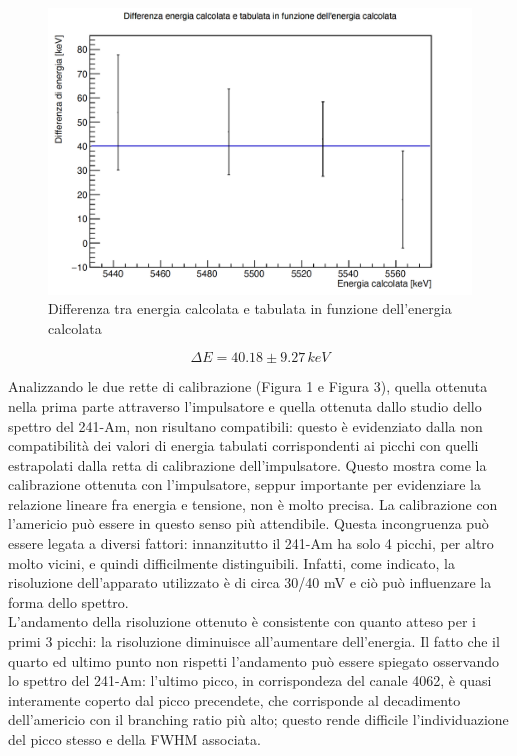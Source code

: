 \documentclass[a4paper,10pt]{article}
\begin{document}
\begin{figure}[H]
    \centering
    \includegraphics[scale=0.4]{discrepanza.png}
    \caption{Differenza tra energia calcolata e tabulata in funzione dell'energia calcolata}
\end{figure}

$$
    \Delta E = 40.18 \pm 9.27\, keV
$$

\noindent Analizzando le due rette di calibrazione (Figura 1 e Figura 3), quella ottenuta nella prima parte attraverso l'impulsatore e quella ottenuta dallo studio dello spettro del 241-Am, non risultano compatibili: questo \`e evidenziato dalla non compatibilit\`a dei valori di energia tabulati corrispondenti ai picchi con quelli estrapolati dalla retta di calibrazione dell'impulsatore. Questo mostra come la calibrazione ottenuta con l'impulsatore, seppur importante per evidenziare la relazione lineare fra energia e tensione, non \`e molto precisa. La calibrazione con l'americio pu\`o essere in questo senso pi\`u attendibile. Questa incongruenza pu\`o essere legata a diversi fattori: innanzitutto il 241-Am ha solo 4 picchi, per altro molto vicini, e quindi difficilmente distinguibili. Infatti, come indicato, la risoluzione dell'apparato utilizzato \`e di circa 30/40 mV e ci\`o pu\`o influenzare la forma dello spettro.\\
L'andamento della risoluzione ottenuto \`e consistente con quanto atteso per i primi 3 picchi: la risoluzione diminuisce all'aumentare dell'energia. Il fatto che il quarto ed ultimo punto non rispetti l'andamento pu\`o essere spiegato osservando lo spettro del 241-Am: l'ultimo picco, in corrispondeza del canale 4062, \`e quasi interamente coperto dal picco precendete, che corrisponde al decadimento dell'americio con il branching ratio pi\`u alto; questo rende difficile l'individuazione del picco stesso e della FWHM associata. 
\end{document}
